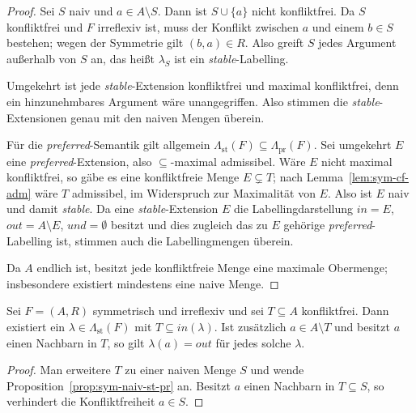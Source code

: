 \begin{proof}
    Sei \(S\) naiv und \(a\in A\setminus S\). Dann ist \(S\cup\{a\}\) nicht
    konfliktfrei. Da \(S\) konfliktfrei und \(F\) irreflexiv ist, muss der
    Konflikt zwischen \(a\) und einem \(b\in S\) bestehen; wegen der Symmetrie
    gilt \((b,a)\in R\). Also greift \(S\) jedes Argument außerhalb von \(S\)
    an, das heißt \(\lambda_S\) ist ein \textit{stable}-Labelling.

    Umgekehrt ist jede \textit{stable}-Extension konfliktfrei und maximal
    konfliktfrei, denn ein hinzunehmbares Argument wäre unangegriffen. Also
    stimmen die \textit{stable}-Extensionen genau mit den naiven Mengen
    überein.

    Für die \textit{preferred}-Semantik gilt allgemein
    \(\Lambda_{\mathrm{st}}(F)\subseteq\Lambda_{\mathrm{pr}}(F)\). Sei
    umgekehrt \(E\) eine \textit{preferred}-Extension, also
    \(\subseteq\)-maximal admissibel. Wäre \(E\) nicht maximal konfliktfrei, so
    gäbe es eine konfliktfreie Menge \(E\subsetneq T\); nach
    Lemma~\ref{lem:sym-cf-adm} wäre \(T\) admissibel, im Widerspruch zur
    Maximalität von \(E\). Also ist \(E\) naiv und damit \textit{stable}. Da
    eine \textit{stable}-Extension \(E\) die Labellingdarstellung
    \(\mathit{in}=E\), \(\mathit{out}=A\setminus E\), \(\mathit{und}=\emptyset\)
    besitzt und dies zugleich das zu \(E\) gehörige
    \textit{preferred}-Labelling ist, stimmen auch die Labellingmengen überein.

    Da \(A\) endlich ist, besitzt jede konfliktfreie Menge eine maximale
    Obermenge; insbesondere existiert mindestens eine naive Menge.
\end{proof}

\begin{Corollary}
    \label{cor:sym-extend}
    Sei \(F=(A,R)\) symmetrisch und irreflexiv und sei \(T\subseteq A\)
    konfliktfrei. Dann existiert ein \(\lambda\in\Lambda_{\mathrm{st}}(F)\) mit
    \(T\subseteq\mathit{in}(\lambda)\). Ist zusätzlich \(a\in A\setminus T\) und
    besitzt \(a\) einen Nachbarn in \(T\), so gilt
    \(\lambda(a)=\mathit{out}\) für jedes solche \(\lambda\).
\end{Corollary}

\begin{proof}
    Man erweitere \(T\) zu einer naiven Menge \(S\) und wende
    Proposition~\ref{prop:sym-naiv-st-pr} an. Besitzt \(a\) einen Nachbarn in
    \(T\subseteq S\), so verhindert die Konfliktfreiheit \(a\in S\).
\end{proof}

